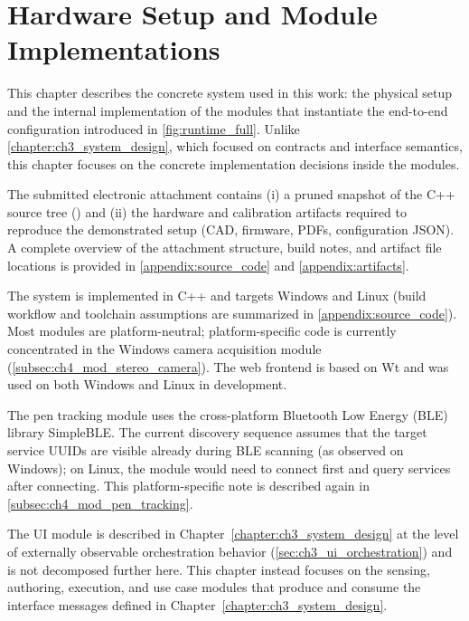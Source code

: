 \chapter{Hardware Setup and Module Implementations}
\label{chapter:ch4_implementation}

This chapter describes the concrete system used in this work: the physical setup and the internal implementation of the modules that instantiate the end-to-end configuration introduced in \autoref{fig:runtime_full}.
Unlike \autoref{chapter:ch3_system_design}, which focused on contracts and interface semantics, this chapter focuses on the concrete implementation decisions inside the modules.

The submitted electronic attachment contains (i) a pruned snapshot of the C++ source tree () and (ii) the hardware and calibration artifacts required to reproduce the demonstrated setup (CAD, firmware, PDFs, configuration JSON).
A complete overview of the attachment structure, build notes, and artifact file locations is provided in \autoref{appendix:source_code} and \autoref{appendix:artifacts}.

The system is implemented in C++ and targets Windows and Linux (build workflow and toolchain assumptions are summarized in \autoref{appendix:source_code}).
Most modules are platform-neutral; platform-specific code is currently concentrated in the Windows camera acquisition module (\autoref{subsec:ch4_mod_stereo_camera}).
The web frontend is based on Wt and was used on both Windows and Linux in development.

The pen tracking module uses the cross-platform Bluetooth Low Energy (BLE) library SimpleBLE. The current discovery sequence assumes that the target service UUIDs are visible already during BLE scanning (as observed on Windows); on Linux, the module would need to connect first and query services after connecting. This platform-specific note is described again in \autoref{subsec:ch4_mod_pen_tracking}.

The UI module is described in Chapter~\ref{chapter:ch3_system_design} at the level of externally observable orchestration behavior (\autoref{sec:ch3_ui_orchestration}) and is not decomposed further here.
This chapter instead focuses on the sensing, authoring, execution, and use case modules that produce and consume the interface messages defined in Chapter~\ref{chapter:ch3_system_design}.

